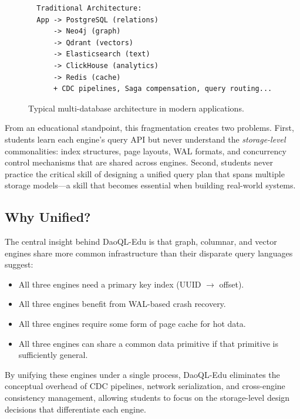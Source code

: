 \documentclass[11pt,a4paper]{article}
\begin{document}
\begin{figure}[ht]
\centering
\begin{verbatim}
  Traditional Architecture:
  App -> PostgreSQL (relations)
      -> Neo4j (graph)
      -> Qdrant (vectors)
      -> Elasticsearch (text)
      -> ClickHouse (analytics)
      -> Redis (cache)
      + CDC pipelines, Saga compensation, query routing...
\end{verbatim}
\caption{Typical multi-database architecture in modern applications.}
\label{fig:fragmentation}
\end{figure}

From an educational standpoint, this fragmentation creates two problems.
First, students learn each engine's query API but never understand the
\emph{storage-level} commonalities: index structures, page layouts, WAL
formats, and concurrency control mechanisms that are shared across engines.
Second, students never practice the critical skill of designing a unified
query plan that spans multiple storage models---a skill that becomes
essential when building real-world systems.

\subsection{Why Unified?}

The central insight behind DaoQL-Edu is that graph, columnar, and vector
engines share more common infrastructure than their disparate query
languages suggest:

\begin{itemize}[leftmargin=*,nosep]
\item All three engines need a primary key index (UUID $\rightarrow$ offset).
\item All three engines benefit from WAL-based crash recovery.
\item All three engines require some form of page cache for hot data.
\item All three engines can share a common data primitive if that primitive
  is sufficiently general.
\end{itemize}

By unifying these engines under a single process, DaoQL-Edu eliminates the
conceptual overhead of CDC pipelines, network serialization, and
cross-engine consistency management, allowing students to focus on the
storage-level design decisions that differentiate each engine.

\end{document}
